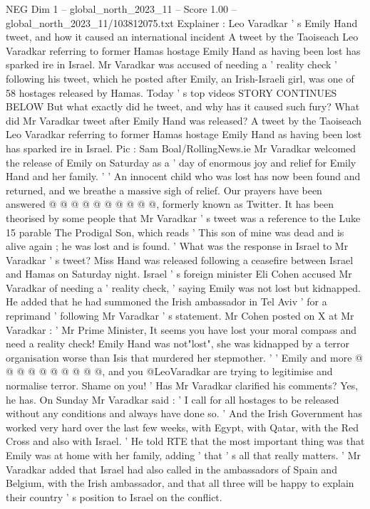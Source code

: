 \begin{textsample}{NEG Dim 1 – global\_north\_2023\_11 – Score 1.00 – global\_north\_2023\_11/103812075.txt}  \label{ex:f1_neg_189}
Explainer : Leo Varadkar ' s Emily Hand tweet, and how it caused an international incident A tweet by the Taoiseach Leo Varadkar referring to former Hamas hostage Emily Hand as having been lost has sparked ire in Israel.
Mr Varadkar was accused of needing a ' reality check ' following his tweet, which he posted after Emily, an Irish-Israeli girl, was one of 58 hostages released by Hamas.
Today ' s top videos STORY CONTINUES BELOW But what exactly did he tweet, and why has it caused such fury?
What did Mr Varadkar tweet after Emily Hand was released?
A tweet by the Taoiseach Leo Varadkar referring to former Hamas hostage Emily Hand as having been lost has sparked ire in Israel.
Pic : Sam Boal/RollingNews.ie Mr Varadkar welcomed the release of Emily on Saturday as a ' day of enormous joy and relief for Emily Hand and her family. ' ' An innocent child who was lost has now been found and returned, and we breathe a massive sigh of relief.
Our prayers have been answered @ @ @ @ @ @ @ @ @ @, formerly known as Twitter.
It has been theorised by some people that Mr Varadkar ' s tweet was a reference to the Luke 15 parable The Prodigal Son, which reads ' This son of mine was dead and is alive again ; he was lost and is found. ' What was the response in Israel to Mr Varadkar ' s tweet?
Miss Hand was released following a ceasefire between Israel and Hamas on Saturday night.
Israel ' s foreign minister Eli Cohen accused Mr Varadkar of needing a ' reality check, ' saying Emily was not lost but kidnapped.
He added that he had summoned the Irish ambassador in Tel Aviv ' for a reprimand ' following Mr Varadkar ' s statement.
Mr Cohen posted on X at Mr Varadkar : ' Mr Prime Minister, It seems you have lost your moral compass and need a reality check!
Emily Hand was not"lost", she was kidnapped by a terror organisation worse than Isis that murdered her stepmother. ' ' Emily and more @ @ @ @ @ @ @ @ @ @, and you @LeoVaradkar are trying to legitimise and normalise terror.
Shame on you! ' Has Mr Varadkar clarified his comments?
Yes, he has.
On Sunday Mr Varadkar said : ' I call for all hostages to be released without any conditions and always have done so. ' And the Irish Government has worked very hard over the last few weeks, with Egypt, with Qatar, with the Red Cross and also with Israel. ' He told RTE that the most important thing was that Emily was at home with her family, adding ' that ' s all that really matters. ' Mr Varadkar added that Israel had also called in the ambassadors of Spain and Belgium, with the Irish ambassador, and that all three will be happy to explain their country ' s position to Israel on the conflict.

\end{textsample}
